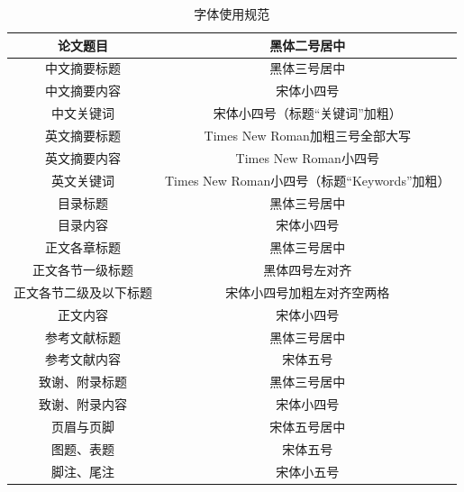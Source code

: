 \documentclass[a4paper]{ctexart}
\begin{document}
\begin{table}[t]
    \centering
    \caption{字体使用规范}
    \begin{tabular}{|c|c|}
        \hline
        论文题目               & 黑体二号居中                                  \\ \hline
        中文摘要标题           & 黑体三号居中                                  \\ \hline
        中文摘要内容           & 宋体小四号                                    \\ \hline
        中文关键词             & 宋体小四号（标题``关键词''加粗）              \\ \hline
        英文摘要标题           & Times New Roman加粗三号全部大写               \\ \hline
        英文摘要内容           & Times New Roman小四号                         \\ \hline
        英文关键词             & Times New Roman小四号（标题``Keywords''加粗） \\ \hline
        目录标题               & 黑体三号居中                                  \\ \hline
        目录内容               & 宋体小四号                                    \\ \hline
        正文各章标题           & 黑体三号居中                                  \\ \hline
        正文各节一级标题       & 黑体四号左对齐                                \\ \hline
        正文各节二级及以下标题 & 宋体小四号加粗左对齐空两格                    \\ \hline
        正文内容               & 宋体小四号                                    \\ \hline
        参考文献标题           & 黑体三号居中                                  \\ \hline
        参考文献内容           & 宋体五号                                      \\ \hline
        致谢、附录标题         & 黑体三号居中                                  \\ \hline
        致谢、附录内容         & 宋体小四号                                    \\ \hline
        页眉与页脚             & 宋体五号居中                                  \\ \hline
        图题、表题             & 宋体五号                                      \\ \hline
        脚注、尾注             & 宋体小五号                                    \\ \hline
    \end{tabular}
    \label{tab:font-spec}
\end{table}
\end{document}
